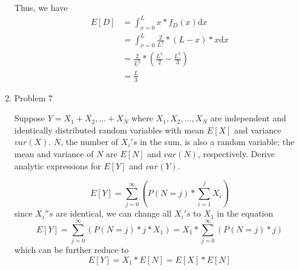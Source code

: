 \documentclass[letterpaper]{article}
\begin{document}
\begin{enumerate}
Thus, we have
\begin{equation}
\begin{split}
E[D] &= \int_{x=0}^{L}{x * f_D(x) \mathrm{d}x}\\
        &= \int_{x=0}^{L}{\frac{2}{L^2} * (L-x) * x \mathrm{d}x}\\
        &= \frac{2}{L^2} * (\frac{L^3}{2} - \frac{L^3}{3})\\
        &= \frac{L}{3}
\end{split}
\end{equation}
\medskip

\item{Problem 7}
\begin{mdframed}
Suppose $Y = X_1 + X_2, \dots + X_N$ where $X_1, X_2, \dots, X_N$ are independent and identically distributed random variables with mean $E[X]$ and variance $var(X)$. $N$, the number of $X_i's$ in the sum, is also a random variable; the mean and variance of $N$ are $E[N]$ and $var(N)$, respectively. Derive analytic expressions for $E[Y]$ and $var(Y)$.
\end{mdframed}

\begin{equation}
E[Y] = \sum^{\infty}_{j = 0}{(P(N = j) * \sum^{j}_{i=1}{X_i})}
\end{equation}
since $X_i''s$ are identical, we can change all $X_i's$ to $X_1$ in the equation
\begin{equation}
E[Y] = \sum^{\infty}_{j = 0}{(P(N = j) * j * X_1)} = X_1 * \sum^{\infty}_{j = 0}{(P(N = j) * j)}
\end{equation}
which can be further reduce to
\begin{equation}
E[Y] = X_1 * E[N] = E[X] * E[N]
\end{equation}


\end{enumerate}
\end{document}
